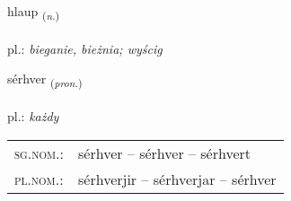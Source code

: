 \documentclass[frontgrid, backgrid]{flacards}\usepackage[]{graphicx}\usepackage[]{xcolor}
\begin{document}
\renewcommand{\flhead}{\vskip5pt \fboxsep=0pt {\small\bfseries\footnotesize Nafnorð | rzeczownik}}
\renewcommand{\fcfoot}{\vskip5pt \fboxsep=0pt \hspace{2pt}{\small\bfseries\footnotesize 3K}}

\renewcommand{\blhead}{\vskip5pt {\small\bfseries\footnotesize Nafnorð | rzeczownik }}
\renewcommand{\bcfoot}{\vskip5pt \hspace{2pt}{\small\bfseries\footnotesize 3K}}


{hlaup \small{\textsubscript{(\textit{n.})}} \\[1ex] %
\textphonetic{[l̥œiːp]} \\
pl.: \emph{bieganie, bieżnia; wyścig} \\  [2ex]
\renewcommand*{\arraystretch}{0.8}
}

\renewcommand{\flhead}{\vskip5pt \fboxsep=0pt {\small\bfseries\footnotesize Fornafn | zaimek}}
\renewcommand{\fcfoot}{\vskip5pt \fboxsep=0pt \hspace{2pt}{\small\bfseries\footnotesize 3K}}

\renewcommand{\blhead}{\vskip5pt {\small\bfseries\footnotesize Fornafn | zaimek }}
\renewcommand{\bcfoot}{\vskip5pt \hspace{2pt}{\small\bfseries\footnotesize 3K}}


{sérhver \small{\textsubscript{(\textit{pron.})}} \\[1ex] %
 \\
pl.: \emph{każdy} \\  [2ex]
\renewcommand*{\arraystretch}{0.8}
\begin{tabular}{ll}
\textsc{sg.nom.}: & sérhver  --  sérhver -- sérhvert \\ 
\textsc{pl.nom.}: & sérhverjir -- sérhverjar -- sérhver
\end{tabular}
}
\end{document}
